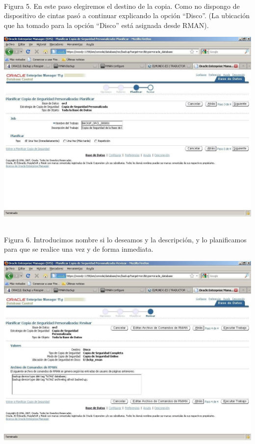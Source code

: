 \begin{enumerate}[1.]
\begin{center}
	\end{center}
	\\Figura 5. En este paso elegiremos el destino de la copia. Como no dispongo de dispositivo de cintas pasó a continuar explicando la opción “Disco”. (La ubicación que ha tomado para la opción “Disco” está asignada desde RMAN).
	\begin{center}
	\includegraphics[width=15cm]{./Imagenes/img-4-2-5}  
	\end{center}
	\\Figura 6. Introducimos nombre si lo deseamos y la descripción, y lo planificamos para que se realice una vez y de forma inmediata.
	\begin{center}
	\includegraphics[width=15cm]{./Imagenes/img-4-2-6}  
	\end{center}

\end{enumerate}
